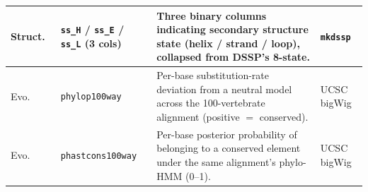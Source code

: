 \documentclass{article}
\begin{document}
\begin{table}[H]
{\begin{tabular}{l l p{7.0cm} l}
    Struct.\ & \texttt{ss\_H} / \texttt{ss\_E} / \texttt{ss\_L} (3 cols) & Three binary columns indicating secondary structure state (helix / strand / loop), collapsed from DSSP's 8-state. & \texttt{mkdssp} \\
    \midrule
    Evo.\ & \texttt{phylop100way}            & Per-base substitution-rate deviation from a neutral model across the 100-vertebrate alignment (positive $=$ conserved). & UCSC bigWig \\
    Evo.\ & \texttt{phastcons100way}         & Per-base posterior probability of belonging to a conserved element under the same alignment's phylo-HMM (0--1). & UCSC bigWig \\
    \bottomrule
  \end{tabular}%
  }
\end{table}

\clearpage


\end{document}

